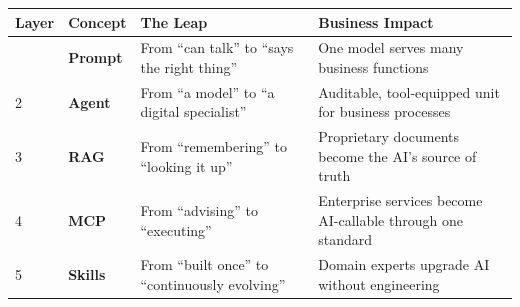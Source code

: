 \documentclass[
  paper=a4,
  fontsize=10pt,
  DIV=14,
  headings=normal,
  headsepline=true,
  parskip=half,
]{scrartcl}
\begin{document}
\begingroup
\small
\begin{longtable}{@{} p{} p{} p{} p{} @{}}
\toprule

\textbf{Layer} & \textbf{Concept} & \textbf{The Leap} & \textbf{Business Impact} \\
\midrule
\endhead
\bottomrule
\endfoot
1 & \textbf{Prompt} & From ``can talk'' to ``says the right thing'' & One model serves many business functions \\[4pt]
2 & \textbf{Agent}  & From ``a model'' to ``a digital specialist'' & Auditable, tool-equipped unit for business processes \\[4pt]
3 & \textbf{RAG}    & From ``remembering'' to ``looking it up'' & Proprietary documents become the AI's source of truth \\[4pt]
4 & \textbf{MCP}    & From ``advising'' to ``executing'' & Enterprise services become AI-callable through one standard \\[4pt]
5 & \textbf{Skills} & From ``built once'' to ``continuously evolving'' & Domain experts upgrade AI without engineering \\
\bottomrule
\end{longtable}
\endgroup
\end{document}
